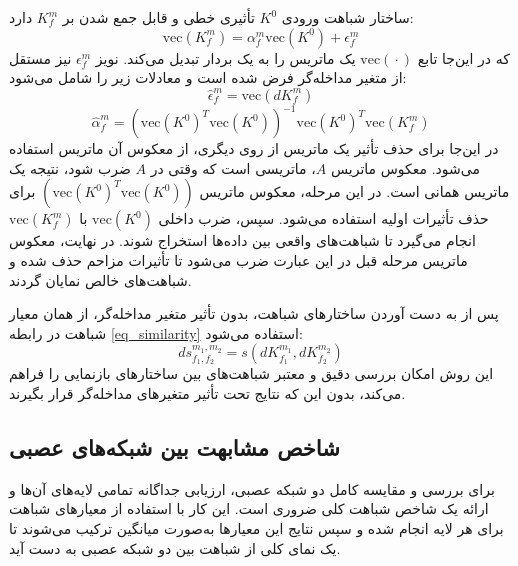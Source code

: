  ساختار شباهت ورودی \(K^0\) تأثیری خطی و قابل جمع شدن بر \(K^{m}_{f}\) دارد:
 \begin{equation}
 	\text{vec}(K^{m}_{f}) = \alpha^{m}_{f} \text{vec}(K^0) + \epsilon^{m}_{f}
 \end{equation}
 که در این‌جا تابع \(\text{vec}(‎\cdot)\) یک ماتریس را به یک بردار تبدیل می‌کند. نویز \(\epsilon^{m}_{f}\) نیز مستقل از متغیر مداخله‌گر فرض شده است و معادلات زیر را شامل می‌شود:
 \begin{equation}
 	\hat{\epsilon}^{m}_{f} = \text{vec}(dK^{m}_{f})
 \end{equation}
 \vspace{-34}
 \begin{equation}
 	\hat{\alpha}^{m}_{f} = (\text{vec}(K^0)^T \text{vec}(K^0))^{-1} \text{vec}(K^0)^T \text{vec}(K^{m}_{f})
 \end{equation}
 در این‌جا برای حذف تأثیر یک ماتریس از روی دیگری، از معکوس آن ماتریس استفاده می‌شود. معکوس ماتریس \(A\)، ماتریسی است که وقتی در \(A\) ضرب شود، نتیجه یک ماتریس همانی%
 است.
 در این مرحله، معکوس ماتریس \((\text{vec}(K^0)^T \text{vec}(K^0))\) برای حذف تأثیرات اولیه استفاده می‌شود. سپس، ضرب داخلی \(\text{vec}(K^0)\) با \(\text{vec}(K^{m}_{f})\) انجام می‌گیرد تا شباهت‌های واقعی بین داده‌ها استخراج شوند. در نهایت، معکوس ماتریس مرحله قبل در این عبارت ضرب می‌شود تا تأثیرات مزاحم حذف شده و شباهت‌های خالص نمایان گردند.
 
 
 پس از به دست آوردن ساختارهای شباهت، بدون تأثیر متغیر مداخله‌گر، از همان معیار شباهت در رابطه
 \eqref{eq_similarity}
 استفاده می‌شود:
 \begin{equation}
 	ds^{m_1,m_2}_{f_1,f_2} = s(dK^{m_1}_{f_1}, dK^{m_2}_{f_2})
 \end{equation}
 این روش امکان بررسی دقیق و معتبر شباهت‌های بین ساختارهای بازنمایی را فراهم می‌کند، بدون این که نتایج تحت تأثیر متغیرهای مداخله‌گر قرار بگیرند.
 
 
 
 \subsection{شاخص مشابهت بین شبکه‌های عصبی}
 برای بررسی و مقایسه کامل دو شبکه عصبی، ارزیابی جداگانه تمامی لایه‌های آن‌ها و ارائه یک شاخص شباهت کلی ضروری است. این کار با استفاده از معیارهای شباهت برای هر لایه انجام شده و سپس نتایج این معیارها به‌صورت میانگین ترکیب می‌شوند تا یک نمای کلی از شباهت بین دو شبکه عصبی به دست آید.
 
 
 
 
 

